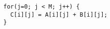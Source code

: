 \documentclass[11pt]{article}
\begin{document}


\begin{verbatim} 
for(j=0; j < M; j++) {
  C[i][j] = A[i][j] + B[i][j];
}
\end{verbatim}

\end{document}

